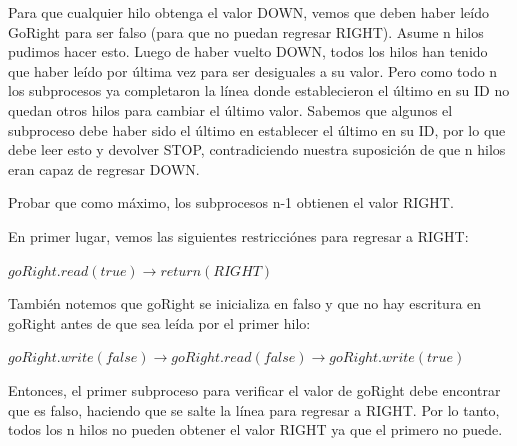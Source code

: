 \documentclass[12pt, letterpaper]{article}
\begin{document}
\begin{itemize}
Para que cualquier hilo obtenga el valor DOWN, vemos que deben haber leído
GoRight para ser falso (para que no puedan regresar RIGHT). Asume n hilos
pudimos hacer esto. Luego de haber vuelto DOWN, todos los hilos
han tenido que haber leído por última vez para ser desiguales a su valor. Pero como todo n
los subprocesos ya completaron la línea donde establecieron el último en su ID
no quedan otros hilos para cambiar el último valor. Sabemos que algunos
el subproceso debe haber sido el último en establecer el último en su ID, por lo que debe leer
esto y devolver STOP, contradiciendo nuestra suposición de que n hilos eran
capaz de regresar DOWN.



Probar que como máximo, los subprocesos n-1 obtienen el valor RIGHT.

En primer lugar, vemos las siguientes restricci\'ones para regresar a RIGHT:


\begin{center}
$goRight.read(true) \rightarrow return(RIGHT)$
\end{center}

También notemos que goRight se inicializa en falso y que no hay escritura en goRight antes de que sea le\'ida por el primer hilo:

\begin{center}
$goRight.write(f alse) \rightarrow goRight.read(f alse) \rightarrow goRight.write(true)$
\end{center}
Entonces, el primer subproceso para verificar el valor de goRight debe encontrar que es falso,
haciendo que se salte la l\'inea para regresar a RIGHT. Por lo tanto, todos los n hilos no pueden
obtener el valor RIGHT ya que el primero no puede.


\end{itemize}
\end{document}
